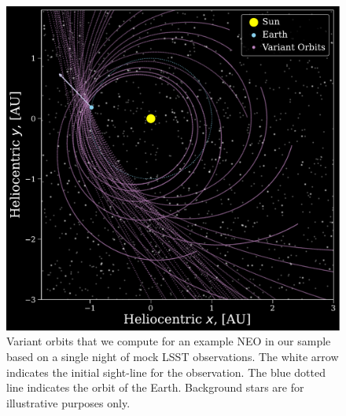 \documentclass[twocolumn]{aastex631}
\begin{document}
\begin{figure}[htb]
    \centering
    \includegraphics[width=\columnwidth]{paper/figures/orbits_example_small.pdf}
    \caption{Variant orbits that we compute for an example NEO in our sample based on a single night of mock LSST observations. The white arrow indicates the initial sight-line for the observation. The blue dotted line indicates the orbit of the Earth. Background stars are for illustrative purposes only.}
    \label{fig:orbits}
\end{figure}

\end{document}
